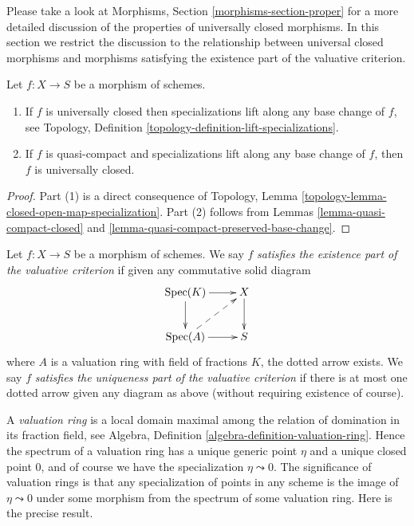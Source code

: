 \medskip\noindent
Please take a look at Morphisms, Section \ref{morphisms-section-proper} for a
more detailed discussion of the properties of universally closed morphisms.
In this section we restrict the discussion to the relationship between
universal closed morphisms and morphisms satisfying the
existence part of the valuative criterion.

\begin{lemma}
\label{lemma-specializations-lift}
Let $f : X \to S$ be a morphism of schemes.
\begin{enumerate}
\item If $f$ is universally closed then specializations lift
along any base change of $f$, see
Topology, Definition \ref{topology-definition-lift-specializations}.
\item If $f$ is quasi-compact and specializations lift
along any base change of $f$, then $f$ is universally closed.
\end{enumerate}
\end{lemma}

\begin{proof}
Part (1) is a direct consequence of
Topology, Lemma \ref{topology-lemma-closed-open-map-specialization}.
Part (2) follows from
Lemmas \ref{lemma-quasi-compact-closed} and
\ref{lemma-quasi-compact-preserved-base-change}.
\end{proof}

\begin{definition}
\label{definition-valuative-criterion}
Let $f : X \to S$ be a morphism of schemes. We say $f$
{\it satisfies the existence part of the valuative criterion}
if given any commutative solid diagram
$$
\xymatrix{
\Spec(K) \ar[r] \ar[d] & X \ar[d] \\
\Spec(A) \ar[r] \ar@{-->}[ru] & S
}
$$
where $A$ is a valuation ring with field of fractions $K$, the
dotted arrow exists. We say $f$ {\it satisfies the uniqueness
part of the valuative criterion} if there is at most one
dotted arrow given any diagram as above (without requiring
existence of course).
\end{definition}

\noindent
A {\it valuation ring} is a local domain maximal among the relation
of domination in its fraction field, see
Algebra, Definition \ref{algebra-definition-valuation-ring}.
Hence the spectrum of a valuation ring has a unique generic point
$\eta$ and a unique closed point $0$, and of course we have the
specialization $\eta \leadsto 0$.
The significance of valuation rings is that any specialization of
points in any scheme is the image of $\eta \leadsto 0$
under some morphism from the spectrum of some valuation ring.
Here is the precise result.

